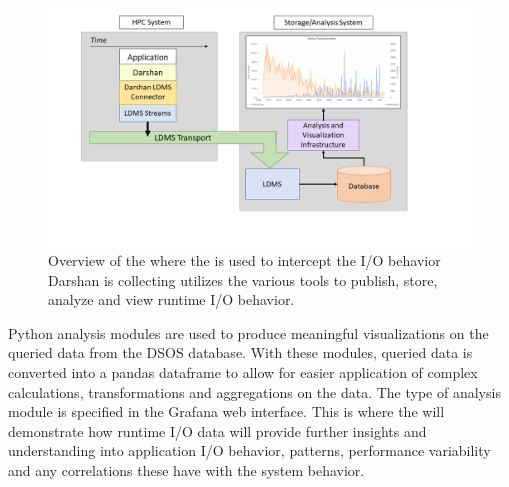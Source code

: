 \begin{figure}
	\centering
	\includegraphics[trim=3cm 2cm 0cm 0cm, clip,width=1.2\linewidth]{figs/darshan-integration.png}
	\caption{Overview of the \Darshan where the \connector is used to intercept the I/O behavior Darshan is collecting utilizes the various tools to publish, store, analyze and view runtime I/O behavior.}
	\label{f:CSV Header and Output}
\end{figure}

Python analysis modules are used to produce meaningful visualizations on the queried data from the DSOS database. With these modules, queried data is converted into a pandas dataframe to allow for easier application of complex calculations, transformations and aggregations on the data. The type of analysis module is specified in the Grafana web interface. This is where the \Darshan will demonstrate how runtime I/O data will provide further insights and understanding into application I/O behavior, patterns, performance variability and any correlations these have with the system behavior.   

